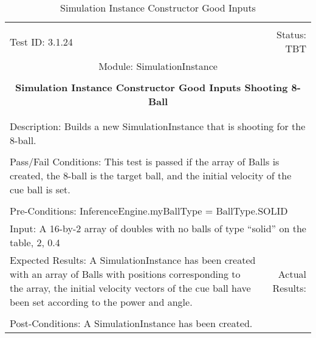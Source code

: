 \documentclass[titlepage]{article}
\begin{document}
\begin{center}%
\begin{table}
\begin{tabular}{|l r|}\hline&\\[-2mm]
	Test ID: 3.1.24	&Status: TBT\\[-3mm]
	\multicolumn{2}{|c|}{Module: SimulationInstance}\\&\\
	\multicolumn{2}{|c|}{\textbf{\large{Simulation Instance Constructor Good Inputs Shooting 8-Ball}}}\\&\\\hline&\\[-3mm]
	\multicolumn{2}{|p{\textwidth}|}{Description: Builds a new SimulationInstance that is shooting for the 8-ball.}\\[1mm]\hline&\\[-3mm]
	\multicolumn{2}{|p{\textwidth}|}{Pass/Fail Conditions: This test is passed if the array of Balls is created, the 8-ball is the target ball, and the initial velocity of the cue ball is set.}\\[1mm]\hline&\\[-3mm]
	\multicolumn{2}{|p{\textwidth}|}{Pre-Conditions: InferenceEngine.myBallType = BallType.SOLID}\\[4mm]
	\multicolumn{2}{|p{\textwidth}|}{Input: A 16-by-2 array of doubles with no balls of type ``solid'' on the table, 2, 0.4}\\[2mm]\hline
	\multicolumn{1}{|p{0.49\textwidth}}{Expected Results: A SimulationInstance has been created with an array of Balls with positions corresponding to the array, the initial velocity vectors of the cue ball have been set according to the power and angle.}	&\multicolumn{1}{|p{0.45\textwidth}|}{Actual Results: }\\\hline&\\[-3mm]
	\multicolumn{2}{|p{\textwidth}|}{Post-Conditions: A SimulationInstance has been created.}\\\hline
\end{tabular}
\caption{Simulation Instance Constructor Good Inputs}
\end{table}
\end{center}
\end{document}
